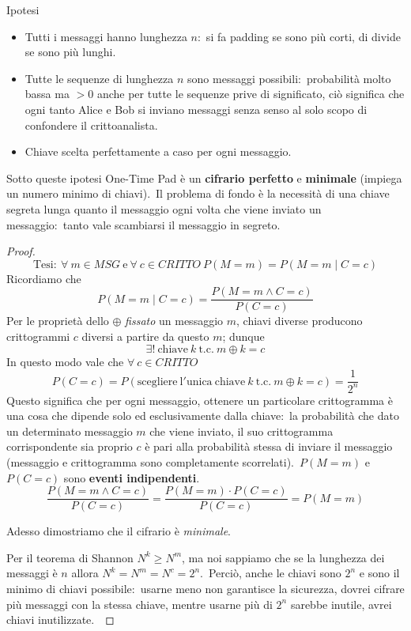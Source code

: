 Ipotesi

\begin{itemize}
    \item Tutti i messaggi hanno lunghezza $n$:\ si fa padding se sono più corti, di divide se sono più lunghi.
    \item Tutte le sequenze di lunghezza $n$ sono messaggi possibili:\ probabilità molto bassa ma $>0$ anche per tutte le sequenze prive di significato, ciò significa che ogni tanto Alice e Bob si inviano messaggi senza senso al solo scopo di confondere il crittoanalista.\
    \item Chiave scelta perfettamente a caso per ogni messaggio.\
\end{itemize}

\noindent Sotto queste ipotesi One-Time Pad è un \textbf{cifrario perfetto} e \textbf{minimale} (impiega un numero minimo di chiavi).\
Il problema di fondo è la necessità di una chiave segreta lunga quanto il messaggio ogni volta che viene inviato un messaggio:\ tanto vale scambiarsi il messaggio in segreto.

\begin{proof}
    \[\mathrm{Tesi:}\ \forall\ m \in \mathit{MSG}\ \mathrm{e}\ \forall\ c \in \mathit{CRITTO}\ P(M = m) = P(M = m \mid C = c)\]
    Ricordiamo che \[P(M = m \mid C = c) = \frac{P(M=m \land C=c)}{P(C=c)}\]
    Per le proprietà dello $\oplus$ \textit{fissato} un messaggio $m$, chiavi diverse producono crittogrammi $c$ diversi a partire da questo $m$; dunque
    \[\exists !\ \mathrm{chiave}\ k\ \mathrm{t.c.}\ m \oplus k = c\]
    In questo modo vale che $\forall\ c \in \mathit{CRITTO}$
    \[P(C = c) = P(\mathrm{scegliere\ l'unica\ chiave}\ k\ \mathrm{t.c.}\ m \oplus k = c ) = \frac{1}{2^n}\]
    Questo significa che per ogni messaggio, ottenere un particolare crittogramma è una cosa che dipende solo ed esclusivamente dalla chiave:\ la probabilità che dato un determinato messaggio $m$ che viene inviato, il suo crittogramma corrispondente sia proprio $c$ è pari alla probabilità stessa di inviare il messaggio (messaggio e crittogramma sono completamente scorrelati).\
    $P(M = m)$ e $P(C = c)$ sono \textbf{eventi indipendenti}.\
    \[\frac{P(M=m \land C=c)}{P(C=c)} = \frac{P(M=m)\cdot P(C=c)}{P(C=c)} = P(M=m)\]

    \noindent Adesso dimostriamo che il cifrario è \textit{minimale}.\

    Per il teorema di Shannon $N^k \geq N^m$, ma noi sappiamo che se la lunghezza dei messaggi è $n$ allora $N^k = N^m = N^c = 2^n$.\
    Perciò, anche le chiavi sono $2^n$ e sono il minimo di chiavi possibile:\ usarne meno non garantisce la sicurezza, dovrei cifrare più messaggi con la stessa chiave, mentre usarne più di $2^n$ sarebbe inutile, avrei chiavi inutilizzate.\

\end{proof}

